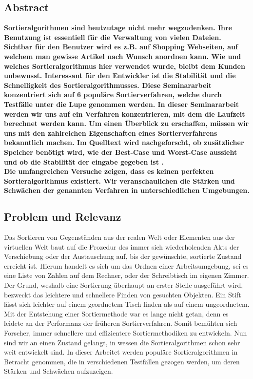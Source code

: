 \documentclass{article}
\begin{document}
\subsection{Abstract}
\textbf{Sortieralgorithmen sind heutzutage nicht mehr wegzudenken. Ihre Benutzung ist essentiell für die Verwaltung von vielen Dateien. Sichtbar für den Benutzer wird es z.B. auf Shopping Webseiten, auf welchem man gewisse Artikel nach Wunsch anordnen kann. Wie und welches Sortieralgorithmus hier verwendet wurde, bleibt dem Kunden unbewusst. Interessant für den Entwickler ist die Stabilität und die Schnelligkeit des Sortieralgorithmusses. Diese Seminararbeit konzentriert sich auf 6 populäre Sortierverfahren, welche durch Testfälle unter die Lupe genommen werden. In dieser Seminararbeit werden wir uns auf ein Verfahren konzentrieren, mit dem die Laufzeit berechnet werden kann. Um einen Überblick zu erschaffen, müssen wir uns mit den zahlreichen Eigenschaften eines Sortierverfahrens bekanntlich machen. Im Quelltext wird nachgeforscht, ob zusätzlicher Speicher benötigt wird, wie der Best-Case und Worst-Case aussieht und ob die Stabilität der eingabe gegeben ist .\\
Die umfangreichen Versuche zeigen, dass es keinen perfekten Sortieralgorithmus existiert. Wir veranschaulichen die Stärken und Schwächen der genannten Verfahren in unterschiedlichen Umgebungen.}
\subsection{Problem und Relevanz}
Das Sortieren von Gegenständen aus der realen Welt oder Elementen aus der virtuellen Welt baut auf die Prozedur des immer sich wiederholenden Akts der Verschiebung oder der Austauschung auf, bis der gewünschte, sortierte Zustand erreicht ist. Hierum handelt es sich um das Ordnen einer Arbeitsumgebung, sei es eine Liste von Zahlen auf dem Rechner, oder der Schreibtisch im eigenen Zimmer. Der Grund, weshalb eine Sortierung überhaupt an erster Stelle ausgeführt wird, bezweckt das leichtere und schnellere Finden von gesuchten Objekten. Ein Stift lässt sich leichter auf einem geordnetem Tisch finden als auf einem ungeordnetem. Mit der Entstehung einer Sortiermethode war es lange nicht getan, denn es leidete an der Performanz der früheren Sortierverfahren. Somit bemühten sich Forscher, immer schnellere und effizientere Sortiermethodiken zu entwickeln. Nun sind wir an einen Zustand gelangt, in wessen die Sortieralgorithmen schon sehr weit entwickelt sind. In dieser Arbeitet werden populäre Sortieralgorithmen in Betracht genommen, die in verschiedenen Testfällen gezogen werden, um deren Stärken und Schwächen aufzuzeigen. 
\end{document}
